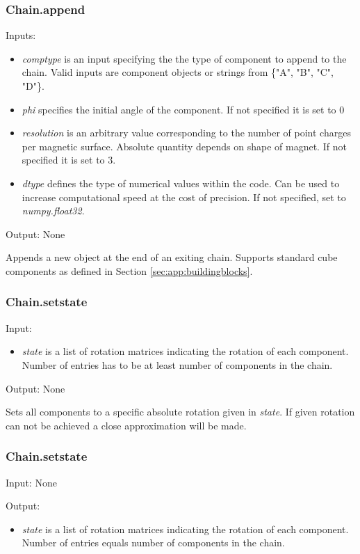 \subsubsection{Chain.append}
Inputs:
\begin{itemize}
    \item \textit{comp\textunderscore type} is an input specifying the the type of component to append to the chain. Valid inputs are component objects or strings from \{"A", "B", "C", "D"\}.
    \item \textit{phi} specifies the initial angle of the component. If not specified it is set to $0$
    \item \textit{resolution} is an arbitrary value corresponding to the number of point charges per magnetic surface. Absolute quantity depends on shape of magnet. If not specified it is set to $3$.
    \item \textit{dtype} defines the type of numerical values within the code. Can be used to increase computational speed at the cost of precision. If not specified, set to \textit{numpy.float32}.
\end{itemize}
Output: None

Appends a new object at the end of an exiting chain. Supports standard cube components as defined in Section \ref{sec:app:buildingblocks}.

\subsubsection{Chain.set\textunderscore state}
Input:
\begin{itemize}
    \item \textit{state} is a list of rotation matrices indicating the rotation of each component. Number of entries has to be at least number of components in the chain.
\end{itemize}
Output: None

Sets all components to a specific absolute rotation given in \textit{state}. If given rotation can not be achieved a close approximation will be made.

\subsubsection{Chain.set\textunderscore state}
Input: None

Output:
\begin{itemize}
    \item \textit{state} is a list of rotation matrices indicating the rotation of each component. Number of entries equals number of components in the chain.
\end{itemize}

